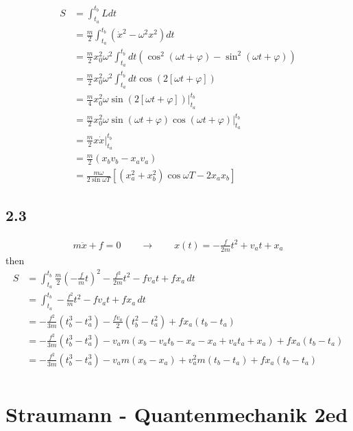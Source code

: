 \documentclass[../main.tex]{subfiles}
\begin{document}
\begin{align}
    S&=\int_{t_a}^{t_b}L dt\\
    &=\frac{m}{2}\int_{t_a}^{t_b}(\dot x^2-\omega^2x^2) dt\\
    &=\frac{m}{2}x_0^2\omega^2\int_{t_a}^{t_b}dt\left(\cos^2(\omega t+\varphi)-\sin^2(\omega t+\varphi)\right)\\
    &=\frac{m}{2}x_0^2\omega^2\int_{t_a}^{t_b}dt\cos(2[\omega t+\varphi])\\
    &=\frac{m}{4}x_0^2\omega\sin(2[\omega t+\varphi])|_{t_a}^{t_b}\\
    &=\frac{m}{2}x_0^2\omega\sin(\omega t+\varphi)\cos(\omega t+\varphi)|_{t_a}^{t_b}\\
    &=\frac{m}{2} x \dot x|_{t_a}^{t_b}\\
    &=\frac{m}{2}(x_bv_b-x_av_a)\\
    &=\frac{m\omega}{2\sin\omega T}\left[(x_a^2+x_b^2)\cos\omega T-2x_ax_b\right]
\end{align}

\subsection{2.3}
\begin{align}
m\ddot{x}+f=0\qquad\rightarrow\qquad x(t)=-\frac{f}{2m}t^2+v_at+x_a
\end{align}
then
\begin{align}
S
&=\int_{t_a}^{t_b}\frac{m}{2}\left(-\frac{f}{m}t\right)^2-\frac{f^2}{2m}t^2-fv_at+fx_a \, dt\\
&=\int_{t_a}^{t_b}-\frac{f^2}{m}t^2-fv_at+fx_a \, dt\\
&=-\frac{f^2}{3m}(t_b^3-t_a^3)-\frac{fv_a}{2}(t_b^2-t_a^2)+fx_a(t_b-t_a)\\
&=-\frac{f^2}{3m}(t_b^3-t_a^3)
-v_am( x_b-v_at_b-x_a- x_a+v_at_a+x_a)
+fx_a(t_b-t_a)\\
&=-\frac{f^2}{3m}(t_b^3-t_a^3)
-v_am( x_b-x_a)+v_a^2m (t_b-t_a)
+fx_a(t_b-t_a)\\
\end{align}


\section{{\sc Straumann} - Quantenmechanik 2ed}
\end{document}
